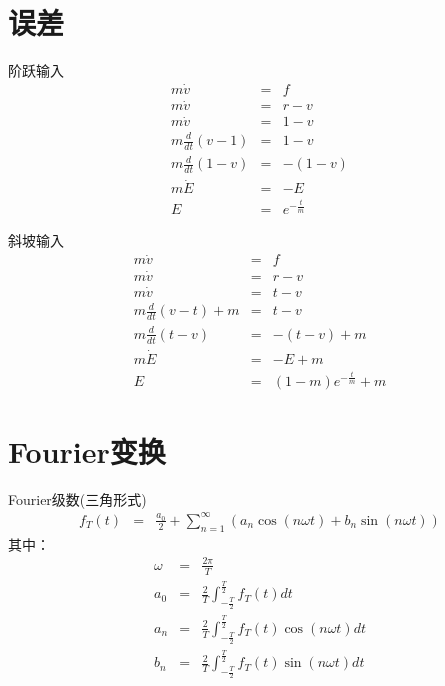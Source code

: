 \documentclass[presentation]{beamer}
\begin{document}
\section{误差}
\label{sec:org1a4048c}
\begin{frame}[label={sec:orgc7b2500}]{阶跃输入}
\begin{eqnarray*}
 m \dot{v} & =& f\\
 m \dot{v} & =& r-v\\
 m \dot{v} & =& 1-v\\
 m \frac{d}{dt}(v-1) & =& 1-v\\
 m \frac{d}{dt}(1-v) & =& -(1-v)\\
m \dot{E} &=& -E \\
E &=& e^{-\frac{t}{m}}
\end{eqnarray*}
\end{frame}

\begin{frame}[label={sec:orgedaff0e}]{斜坡输入}
\begin{eqnarray*}
 m \dot{v} & =& f\\
 m \dot{v} & =& r-v\\
 m \dot{v} & =& t-v\\
 m \frac{d}{dt}(v-t) +m & =& t-v\\
 m \frac{d}{dt}(t-v) & =& -(t-v) +m\\
m \dot{E} &=& -E +m\\
E &=& (1-m)e^{-\frac{t}{m}}+m
\end{eqnarray*}
\end{frame}

\section{Fourier变换}
\label{sec:org6b5a192}
\begin{frame}[label={sec:orgcad1cd3}]{Fourier级数(三角形式)}
\begin{eqnarray*}
f_T(t) & =& \frac{a_0}{2}+\sum_{n=1}^{\infty}(a_n\cos(n\omega t)+b_n\sin(n\omega t))  
\end{eqnarray*}
其中：
\begin{eqnarray*}
\omega & =& \frac{2\pi}{T}\\
a_0 &=& \frac{2}{T}\int_{-\frac{T}{2}}^{\frac{T}{2}}f_T(t)dt \\
a_n &=& \frac{2}{T}\int_{-\frac{T}{2}}^{\frac{T}{2}}f_T(t)\cos(n\omega t)dt \\
b_n &=& \frac{2}{T}\int_{-\frac{T}{2}}^{\frac{T}{2}}f_T(t)\sin(n\omega t)dt \\
\end{eqnarray*}
\end{frame}
\end{document}
